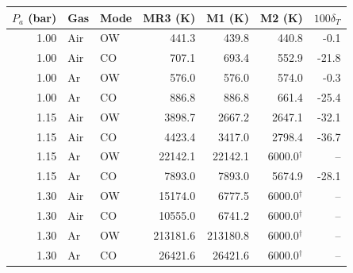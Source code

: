 \begin{tabular}{rllrrrr}\toprule
$P_a$ (bar) & Gas & Mode & MR3 (K) & M1 (K) & M2 (K) & $100\delta_T$ \\
\midrule
1.00 & Air & OW & 441.3 & 439.8 & 440.8 & -0.1 \\
1.00 & Air & CO & 707.1 & 693.4 & 552.9 & -21.8 \\
1.00 & Ar & OW & 576.0 & 576.0 & 574.0 & -0.3 \\
1.00 & Ar & CO & 886.8 & 886.8 & 661.4 & -25.4 \\
1.15 & Air & OW & 3898.7 & 2667.2 & 2647.1 & -32.1 \\
1.15 & Air & CO & 4423.4 & 3417.0 & 2798.4 & -36.7 \\
1.15 & Ar & OW & 22142.1 & 22142.1 & 6000.0$^\dagger$ & -- \\
1.15 & Ar & CO & 7893.0 & 7893.0 & 5674.9 & -28.1 \\
1.30 & Air & OW & 15174.0 & 6777.5 & 6000.0$^\dagger$ & -- \\
1.30 & Air & CO & 10555.0 & 6741.2 & 6000.0$^\dagger$ & -- \\
1.30 & Ar & OW & 213181.6 & 213180.8 & 6000.0$^\dagger$ & -- \\
1.30 & Ar & CO & 26421.6 & 26421.6 & 6000.0$^\dagger$ & -- \\
\bottomrule\end{tabular}

